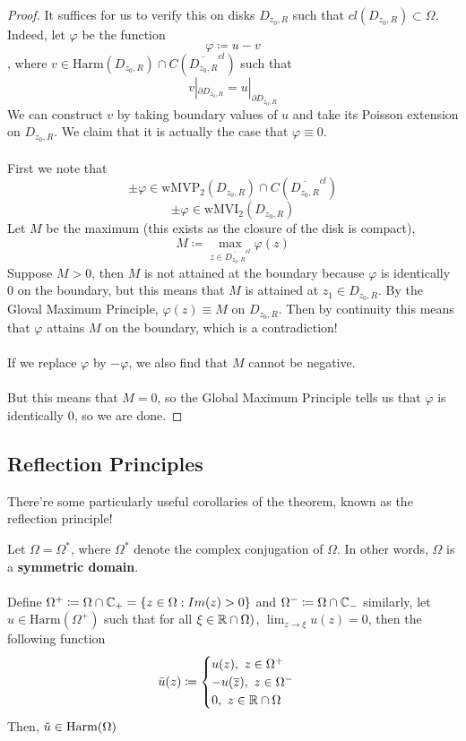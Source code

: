 \begin{proof}
    It suffices for us to verify this on disks $D_{z_0, R}$ such that $cl(D_{z_0, R}) \subset \Omega$. Indeed, let $\varphi$ be the function
    \[\varphi \coloneqq u - v\]
    , where $v \in \text{Harm}(D_{z_0, R}) \cap C(\overline{D_{z_0, R}}^{cl})$ such that
    \[v|_{\partial D_{z_0, R}} = u|_{\partial D_{z_0, R}}\]
    We can construct $v$ by taking boundary values of $u$ and take its Poisson extension on $D_{z_0, R}$. We claim that it is actually the case that $\varphi \equiv 0$.\\\\
    First we note that
    \[\pm \varphi \in \text{wMVP}_2(D_{z_0, R}) \cap C(\overline{D_{z_0, R}}^{cl})\]
    \[\pm \varphi \in \text{wMVI}_2(D_{z_0, R})\]
    Let $M$ be the maximum (this exists as the closure of the disk is compact),
    \[M \coloneqq \max_{z \in \overline{D_{z_0, R}}^{cl}} \varphi(z)\]
    Suppose $M > 0$, then $M$ is not attained at the boundary because $\varphi$ is identically $0$ on the boundary, but this means that $M$ is attained at $z_1 \in D_{z_0, R}$. By the Gloval Maximum Principle, $\varphi(z) \equiv M$ on $D_{z_0, R}$. Then by continuity this means that $\varphi$ attains $M$ on the boundary, which is a contradiction!\\\\
    If we replace $\varphi$ by $-\varphi$, we also find that $M$ cannot be negative.\\\\
    But this means that $M = 0$, so the Global Maximum Principle tells us that $\varphi$ is identically $0$, so we are done.
\end{proof}

\subsection{Reflection Principles}

There're some particularly useful corollaries of the theorem, known as the reflection principle!

\begin{corollary}
    Let $\Omega = \Omega^*$, where $\Omega^*$ denote the complex conjugation of $\Omega$. In other words, $\Omega$ is a \textbf{symmetric domain}.\\\\
    Define $\Omega^+ \coloneqq \Omega \cap \mathbb{C}_+ = \{z \in \Omega: Im(z) > 0\}$ and $\Omega^- \coloneqq \Omega \cap \mathbb{C}_-$ similarly, let $u \in \text{Harm}(\Omega^+)$ such that for all $\xi \in \mathbb{R} \cap \Omega)$, $\lim_{z \to \xi} u(z) = 0$, then the following function
    \[\Tilde{u}(z) \coloneqq \begin{cases}
    u(z),\ z \in \Omega^+\\
    -u(\overline{z}),\ z \in \Omega^-\\
    0,\ z \in \mathbb{R} \cap \Omega
    \end{cases}\]
    Then, $\Tilde{u} \in \text{Harm}(\Omega)$
\end{corollary}

